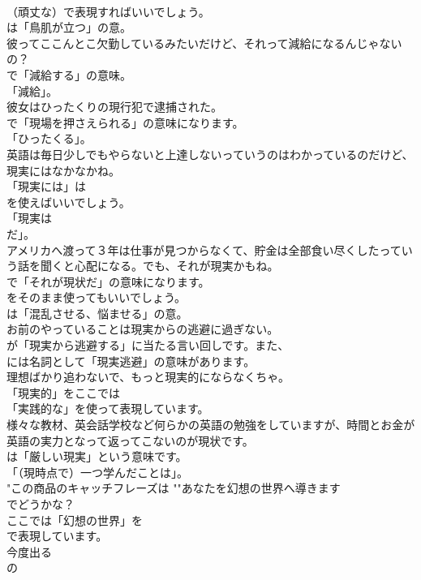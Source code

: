 \documentclass[8pt]{extreport}
\begin{document}
\begin{CJK}{UTF8}{min}
\\	（頑丈な）で表現すればいいでしょう。
\\	は「鳥肌が立つ」の意。	
\\	彼ってここんとこ欠勤しているみたいだけど、それって減給になるんじゃないの？ 
\\	で「減給する」の意味。
\\	「減給」。	
\\	彼女はひったくりの現行犯で逮捕された。 
\\	で「現場を押さえられる」の意味になります。
\\	「ひったくる」。	
\\	英語は毎日少しでもやらないと上達しないっていうのはわかっているのだけど、現実にはなかなかね。 
\\	「現実には」は
\\	を使えばいいでしょう。
\\	「現実は 
\\	だ」。	
\\	アメリカへ渡って３年は仕事が見つからなくて、貯金は全部食い尽くしたっていう話を聞くと心配になる。でも、それが現実かもね。 
\\	で「それが現状だ」の意味になります。
\\	をそのまま使ってもいいでしょう。
\\	は「混乱させる、悩ませる」の意。	
\\	お前のやっていることは現実からの逃避に過ぎない。 
\\	が「現実から逃避する」に当たる言い回しです。また、
\\	には名詞として「現実逃避」の意味があります。	
\\	理想ばかり追わないで、もっと現実的にならなくちゃ。 
\\	「現実的」をここでは
\\	「実践的な」を使って表現しています。	
\\	様々な教材、英会話学校など何らかの英語の勉強をしていますが、時間とお金が英語の実力となって返ってこないのが現状です。 
\\	は「厳しい現実」という意味です。
\\	「（現時点で）一つ学んだことは」。	
\\	"この商品のキャッチフレーズは ""あなたを幻想の世界へ導きます
\\	でどうかな？ 
\\	ここでは「幻想の世界」を 
\\	で表現しています。
\\	今度出る
\\	の

\end{CJK}
\end{document}
